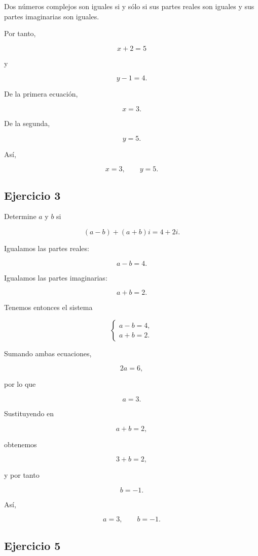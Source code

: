 \documentclass[12pt]{article}
\begin{document}
Dos números complejos son iguales si y sólo si sus partes reales son
iguales y sus partes imaginarias son iguales.

Por tanto,

\[
x+2=5
\]

y

\[
y-1=4.
\]

De la primera ecuación,

\[
x=3.
\]

De la segunda,

\[
y=5.
\]

Así,

\[
\boxed{x=3,\qquad y=5}.
\]


\subsection*{Ejercicio 3}

Determine \(a\) y \(b\) si

\[
(a-b)+(a+b)i=4+2i.
\]

Igualamos las partes reales:

\[
a-b=4.
\]

Igualamos las partes imaginarias:

\[
a+b=2.
\]

Tenemos entonces el sistema

\[
\begin{cases}
a-b=4,\\
a+b=2.
\end{cases}
\]

Sumando ambas ecuaciones,

\[
2a=6,
\]

por lo que

\[
a=3.
\]

Sustituyendo en

\[
a+b=2,
\]

obtenemos

\[
3+b=2,
\]

y por tanto

\[
b=-1.
\]

Así,

\[
\boxed{a=3,\qquad b=-1}.
\]


\subsection*{Ejercicio 5}
\end{document}
